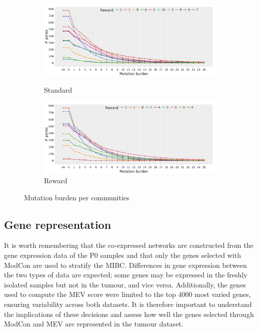 \begin{figure}[!htb]
    \centering
    \begin{subfigure}[b]{1.0\textwidth}
        \includegraphics[width=\textwidth,keepaspectratio]{Sections/Network_I/Resources/P0/Comms/Mut_evo_Std_4k_v3.png}
        \label{fig:N_I:p0_std_mut_burden}
        \caption{Standard}
    \end{subfigure}
    \begin{subfigure}[b]{1.0\textwidth}
        \includegraphics[width=\textwidth,keepaspectratio]{Sections/Network_I/Resources/P0/Comms/Mut_evo_Rwd_4k_v3.png}
        \caption{Reward}
        \label{fig:N_I:p0_rwd_mut_burden}
    \end{subfigure}
    \caption{Mutation burden per communities}
    \label{fig:N_I:p0_mut_burden}
\end{figure}


\subsection{Gene representation} \label{s:N_I:gene_rep}

It is worth remembering that the co-expressed networks are constructed from the gene expression data of the P0 samples and that only the genes selected with ModCon are used to stratify the MIBC. Differences in gene expression between the two types of data are expected; some genes may be expressed in the freshly isolated samples but not in the tumour, and vice versa. Additionally, the genes used to compute the MEV score were limited to the top 4000 most varied genes, ensuring variability across both datasets. It is therefore important to understand the implications of these decisions and assess how well the genes selected through ModCon and MEV are represented in the tumour dataset.

